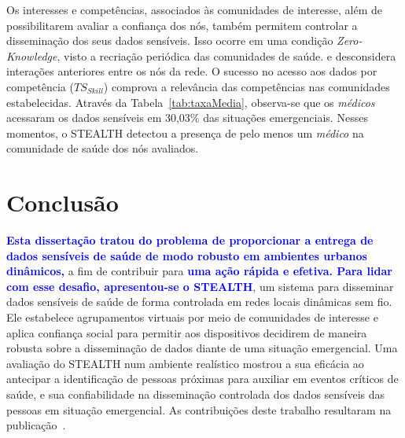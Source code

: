 \documentclass[12pt]{article}
\newcommand{\as}[1]{\textcolor{blue}{{\bf #1}}}
\newcommand{\agn}[1]{\textcolor{auburn}{#1}}
\begin{document}
Os interesses e competências, associados às comunidades de interesse, além de possibilitarem avaliar a confiança dos nós, também permitem controlar a disseminação dos seus dados sensíveis. Isso ocorre em uma condição \textit{Zero-Knowledge},
visto a recriação periódica das comunidades de saúde.
e desconsidera interações anteriores entre os nós da rede. O sucesso no acesso aos dados por competência ($TS_{Skill}$) comprova a
\agn{relevância}
das competências nas comunidades estabelecidas. Através da Tabela~\ref{tab:taxaMedia}, observa-se que os \textit{médicos} acessaram os dados sensíveis em 30,03\% das situações emergenciais. Nesses momentos, o \mbox{STEALTH} detectou a presença de pelo menos um \textit{médico} na comunidade de saúde dos nós avaliados.

\vspace{-0.2cm}

\section{Conclusão}
\label{sec:conc}

\as{Esta dissertação tratou do problema de proporcionar a entrega de dados sensíveis de saúde de modo robusto em ambientes urbanos dinâmicos, }\agn{a fim de contribuir para}\as{
uma ação rápida e efetiva. Para lidar com esse  desafio, apresentou-se o
\mbox{STEALTH}},
um sistema para disseminar dados sensíveis de saúde de forma controlada em redes locais dinâmicas sem fio. Ele estabelece agrupamentos virtuais por meio de comunidades de interesse e aplica confiança social
\agn{para}
permitir aos dispositivos decidirem de maneira robusta
sobre a disseminação de dados diante de uma situação emergencial. Uma avaliação do \mbox{STEALTH} num ambiente realístico mostrou a sua eficácia ao antecipar a identificação de pessoas próximas para auxiliar em eventos críticos de saúde, e sua confiabilidade na disseminação controlada dos dados sensíveis das pessoas em situação emergencial. As contribuições deste trabalho resultaram na publicação~\cite{batista2019sbseg}.




\small


\end{document}
